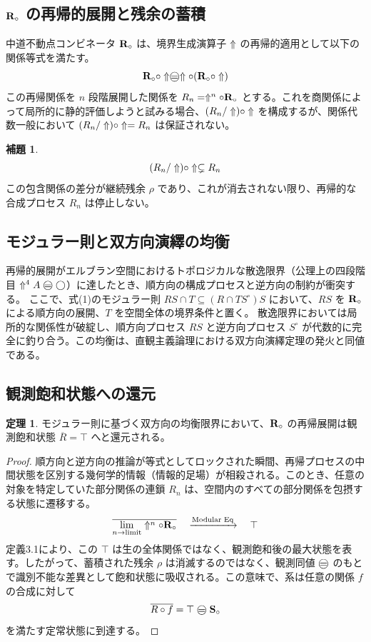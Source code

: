 \documentclass[11pt,a4paper]{ltjsarticle}
\theoremstyle{definition}
\newtheorem{theorem}{定理}[section]
\newtheorem{lemma}{補題}[section]
\begin{document}
\subsection{$\mathbf{R}_{\circ}$ の再帰的展開と残余の蓄積}
中道不動点コンビネータ $\mathbf{R}_{\circ}$ は、境界生成演算子 $\Uparrow$ の再帰的適用として以下の関係等式を満たす。
\begin{equation}
\Rmw \circ \metanegation \mweq \metanegation \circ (\Rmw \circ \metanegation)
\end{equation}
この再帰関係を $n$ 段階展開した関係を $R_n = \Uparrow^n \circ \mathbf{R}_{\circ}$ とする。これを商関係によって局所的に静的評価しようと試みる場合、$(R_n/\Uparrow) \circ \Uparrow$ を構成するが、関係代数一般において $(R_n/\Uparrow)\circ \Uparrow = R_n$ は保証されない。
\begin{lemma}
\begin{equation}
(R_n / \Uparrow) \circ \Uparrow \subsetneq R_n
\end{equation}
この包含関係の差分が継続残余 $\rho$ であり、これが消去されない限り、再帰的な合成プロセス $R_n$ は停止しない。
\end{lemma}

\subsection{モジュラー則と双方向演繹の均衡}
再帰的展開がエルブラン空間におけるトポロジカルな散逸限界（公理上の四段階目 $\metanegation^4 A \mweq \dfix$）に達したとき、順方向の構成プロセスと逆方向の制約が衝突する。
ここで、式(1)のモジュラー則 $RS \cap T \subseteq (R \cap TS^\circ)S$ において、$RS$ を $\mathbf{R}_{\circ}$ による順方向の展開、$T$ を空間全体の境界条件と置く。
散逸限界においては局所的な関係性が破綻し、順方向プロセス $RS$ と逆方向プロセス $S^\circ$ が代数的に完全に釣り合う。この均衡は、直観主義論理における双方向演繹定理の発火と同値である。

\subsection{観測飽和状態への還元}
\begin{theorem}
モジュラー則に基づく双方向の均衡限界において、$\mathbf{R}_{\circ}$ の再帰展開は観測飽和状態 $\overline{R}=\top$ へと還元される。
\end{theorem}
\begin{proof}
順方向と逆方向の推論が等式としてロックされた瞬間、再帰プロセスの中間状態を区別する幾何学的情報（情報的足場）が相殺される。このとき、任意の対象を特定していた部分関係の連鎖 $R_n$ は、空間内のすべての部分関係を包摂する状態に遷移する。
\begin{equation}
\overline{\lim_{n \to \text{limit}} \Uparrow^n \circ \mathbf{R}_{\circ}}
\quad \xrightarrow{\text{Modular Eq}} \quad \top
\end{equation}
定義3.1により、この $\top$ は生の全体関係ではなく、観測飽和後の最大状態を表す。したがって、蓄積された残余 $\rho$ は消滅するのではなく、観測同値 $\mweq$ のもとで識別不能な差異として飽和状態に吸収される。この意味で、系は任意の関係 $f$ の合成に対して
\[
\overline{R \circ f}=\top \mweq \Svoid
\]
を満たす定常状態に到達する。
\end{proof}
\end{document}
